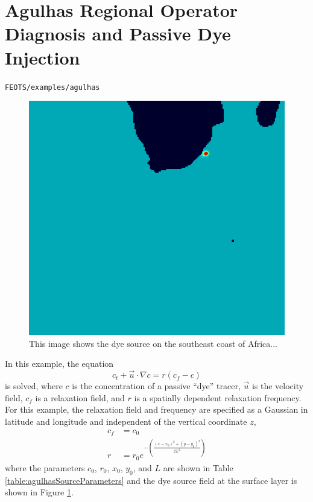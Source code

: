 \documentclass{softwaremanual}
\begin{document}
\pagebreak
\section{Agulhas Regional Operator Diagnosis and Passive Dye Injection}
\begin{center}
\texttt{FEOTS/examples/agulhas}
\end{center}
\begin{figure}[t!]
\centering
\includegraphics[width=0.75\linewidth,natwidth=600,natheight=549]{agulhas_local_sourcespot.png}
\caption{This image shows the dye source on the southeast coast of Africa...}\label{fig:agulhasSource}
\end{figure}
In this example, the equation
\begin{equation}
 c_t + \vec{u} \cdot \nabla c = r( c_f - c )
\end{equation}
is solved, where $c$ is the concentration of a passive ``dye'' tracer, $\vec{u}$ is the velocity field, $c_f$ is a relaxation field, and $r$ is a spatially dependent relaxation frequency. For this example, the relaxation field and frequency are specified as a Gaussian in latitude and longitude and independent of the vertical coordinate $z$,
\begin{subequations}
\begin{align}
  c_f &= c_0 \\
  r   &= r_0 e^{ -\left( \frac{ (x-x_0)^2 + (y-y_0)^2 }{2 L^2 }\right)}
\end{align}
\end{subequations}
where the parameters $c_0$, $r_0$, $x_0$, $y_0$, and $L$ are shown in Table \ref{table:agulhasSourceParameters} and the dye source field at the surface layer is shown in Figure \ref{fig:agulhasSource}.
\end{document}
